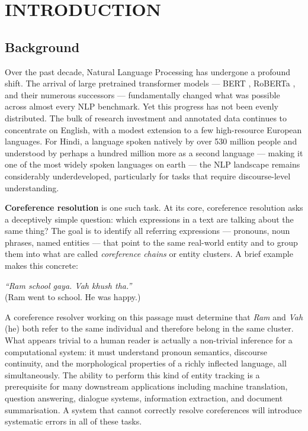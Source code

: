 \documentclass[12pt,a4paper]{report}
\begin{document}
\newpage
\listoftables
{}

\newpage
{}
\setcounter{page}{1}


\chapter{INTRODUCTION}

\section{Background}

Over the past decade, Natural Language Processing has undergone a profound shift. The arrival of large pretrained transformer models --- BERT \cite{devlin2018bert}, RoBERTa \cite{liu2019roberta}, and their numerous successors --- fundamentally changed what was possible across almost every NLP benchmark. Yet this progress has not been evenly distributed. The bulk of research investment and annotated data continues to concentrate on English, with a modest extension to a few high-resource European languages. For Hindi, a language spoken natively by over 530 million people and understood by perhaps a hundred million more as a second language --- making it one of the most widely spoken languages on earth --- the NLP landscape remains considerably underdeveloped, particularly for tasks that require discourse-level understanding.

\textbf{Coreference resolution} is one such task. At its core, coreference resolution asks a deceptively simple question: which expressions in a text are talking about the same thing? The goal is to identify all referring expressions --- pronouns, noun phrases, named entities --- that point to the same real-world entity and to group them into what are called \textit{coreference chains} or entity clusters. A brief example makes this concrete:

\begin{center}
\textit{``Ram school gaya. Vah khush tha.''}\\
(Ram went to school. He was happy.)
\end{center}

\noindent A coreference resolver working on this passage must determine that \textit{Ram} and \textit{Vah} (he) both refer to the same individual and therefore belong in the same cluster. What appears trivial to a human reader is actually a non-trivial inference for a computational system: it must understand pronoun semantics, discourse continuity, and the morphological properties of a richly inflected language, all simultaneously. The ability to perform this kind of entity tracking is a prerequisite for many downstream applications including machine translation, question answering, dialogue systems, information extraction, and document summarisation. A system that cannot correctly resolve coreferences will introduce systematic errors in all of these tasks.
\end{document}
